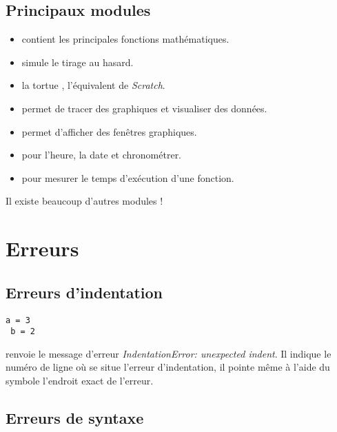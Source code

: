 \documentclass[11pt,class=report,crop=false]{standalone}
\begin{document}
\subsection{Principaux modules}


\begin{itemize}
  \item {} \quad contient les principales fonctions mathématiques. 
  \item {} \quad simule le tirage au hasard.
  \item {} \quad la tortue \Python, l'équivalent de \emph{Scratch}.
  \item {} \quad permet de tracer des graphiques et visualiser des données.
  \item {} \quad permet d'afficher des fenêtres graphiques.
  \item {} \quad pour l'heure, la date et chronométrer.
  \item {} \quad pour mesurer le temps d’exécution d'une fonction.
  
\end{itemize}

Il existe beaucoup d'autres modules !



\section{Erreurs}

\subsection{Erreurs d'indentation}

\begin{lstlisting}
a = 3
 b = 2
\end{lstlisting}

\Python{} renvoie le message d'erreur \emph{IndentationError: unexpected indent}.
Il indique le numéro de ligne où se situe l'erreur d'indentation, il pointe même à l'aide du symbole \og{}\ci{\^}\fg{} l'endroit exact de l'erreur.

\subsection{Erreurs de syntaxe}
\end{document}
